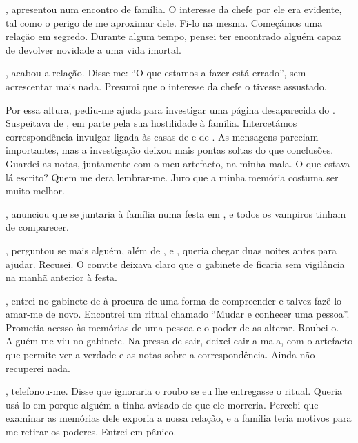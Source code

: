 {,  apresentou  num encontro de família. O interesse da chefe por ele era evidente, tal como o perigo de me aproximar dele. Fi-lo na mesma. Começámos uma relação em segredo. Durante algum tempo, pensei ter encontrado alguém capaz de devolver novidade a uma vida imortal.

,  acabou a relação. Disse-me: ``O que estamos a fazer está errado'', sem acrescentar mais nada. Presumi que o interesse da chefe o tivesse assustado.

Por essa altura,  pediu-me ajuda para investigar uma página desaparecida do . Suspeitava de , em parte pela sua hostilidade à família. Intercetámos correspondência invulgar ligada às casas de  e de . As mensagens pareciam importantes, mas a investigação deixou mais pontas soltas do que conclusões. Guardei as notas, juntamente com o meu artefacto, na minha mala. O que estava lá escrito? Quem me dera lembrar-me. Juro que a minha memória costuma ser muito melhor.

,  anunciou que  se juntaria à família numa festa em , e todos os vampiros tinham de comparecer.

,  perguntou se mais alguém, além de ,  e , queria chegar duas noites antes para ajudar. Recusei. O convite deixava claro que o gabinete de  ficaria sem vigilância na manhã anterior à festa.

, entrei no gabinete de  à procura de uma forma de compreender  e talvez fazê-lo amar-me de novo. Encontrei um ritual chamado ``Mudar e conhecer uma pessoa''. Prometia acesso às memórias de uma pessoa e o poder de as alterar. Roubei-o. Alguém me viu no gabinete. Na pressa de sair, deixei cair a mala, com o artefacto que permite ver a verdade e as notas sobre a correspondência. Ainda não recuperei nada.

,  telefonou-me. Disse que ignoraria o roubo se eu lhe entregasse o ritual. Queria usá-lo em  porque alguém a tinha avisado de que ele morreria. Percebi que examinar as memórias dele exporia a nossa relação, e a família teria motivos para me retirar os poderes. Entrei em pânico.

}
